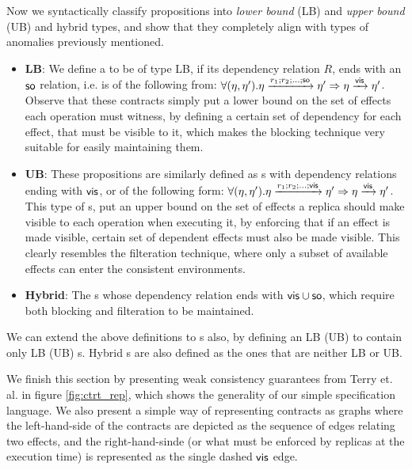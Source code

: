 Now we syntactically  classify propositions into \emph{lower bound} (LB) and
\emph{upper bound} (UB) and hybrid types, and show that they completely
align with types of
anomalies previously mentioned. 
\begin{itemize}
\item {\bf LB}: We define a \propS{} to be of type LB, 
if its dependency relation $R$, ends with an ${\normalfont \textsf{so}}$ relation, i.e. is of
the following from: $\forall(\eta,\eta'). \eta \xrightarrow{r_1;r_2;...;{\normalfont \textsf{so}}} \eta'
\Rightarrow \eta \xrightarrow{{\normalfont \textsf{vis}}} \eta'$.
Observe that these contracts simply put a lower bound on the set of
effects each operation must witness, by defining a certain set of
dependency for each effect, that must be visible to it, which makes the
blocking technique very suitable for easily maintaining them.
\item {\bf UB}:  These propositions are similarly defined as \propS{}s
with dependency relations ending with ${\normalfont \textsf{vis}}$, or of the following form: 
$\forall(\eta,\eta'). \eta \xrightarrow{r_1;r_2;...;{\normalfont \textsf{vis}}} \eta'
\Rightarrow \eta \xrightarrow{{\normalfont \textsf{vis}}} \eta'$.
This type of \propS{}s, put an upper bound on the set of effects 
a replica should make visible to each operation when executing it, by
enforcing that if an effect is made visible, certain set of dependent
effects must also be made visible. This clearly resembles the
filteration technique, where only a subset of available effects can enter
the consistent environments.
\item {\bf Hybrid}: The \propS{}s whose dependency relation ends with
${\normalfont \textsf{vis}}\cup {\normalfont \textsf{so}}$, which require both blocking and filteration to be
maintained. 
\end{itemize}
We can extend the above definitions to \specS{}s also, by defining an LB
(UB) \specS{} to contain only LB (UB) \propS{}s. Hybrid \specS{}s are also
defined as the ones that are neither LB or UB.

We finish this section by presenting weak consistency guarantees from
Terry et. al. in figure \ref{fig:ctrt_rep}, which shows the generality
of our simple specification language. We also present a simple way of
representing contracts as graphs where the left-hand-side of the
contracts are depicted as the sequence of edges relating two effects,
and the right-hand-sinde (or what must be enforced by replicas at the
execution time) is represented as the single dashed ${\normalfont \textsf{vis}}$ edge.

